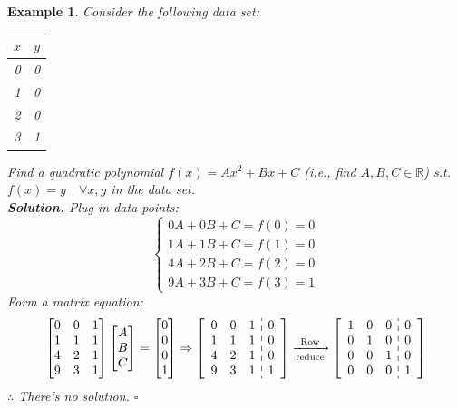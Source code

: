 \documentclass[12pt, a4paper]{article}
\newtheorem{eg}{Example}[subsection]
\newenvironment*{sol}{\indent\textbf{Solution. }}{\hfill{$\square$}\par}
\def\R{{\mathbb{R}}}
\def\C{{\mathbb{C}}}
\begin{document}
\begin{eg}\label{eg5.3.2}
	Consider the following data set: 
	\begin{center}\begin{tabular}{c|c}$x$&$y$\\\hline0&0\\1&0\\2&0\\3&1\end{tabular}\end{center} Find a quadratic polynomial $f(x)=Ax^2+Bx+C$ (i.e., find $A,B,C\in\R$) \emph{s.t.} $f(x)=y\quad\forall x,y$ in the data set.\\ 
	\begin{sol}
		Plug-in data points: \[\begin{cases}0A+0B+C=f(0)=0\\1A+1B+C=f(1)=0\\4A+2B+C=f(2)=0\\9A+3B+C=f(3)=1\end{cases}\]
		Form a matrix equation: \[\begin{bmatrix}0&0&1\\1&1&1\\4&2&1\\9&3&1\end{bmatrix}\begin{bmatrix}A\\B\\C\end{bmatrix}=\begin{bmatrix}0\\0\\0\\1\end{bmatrix}\Rightarrow\left[\begin{array}{c:c}\begin{matrix}0&0&1\\1&1&1\\4&2&1\\9&3&1\end{matrix}&\begin{matrix}0\\0\\0\\1\end{matrix}\end{array}\right]\xrightarrow[\text{reduce}]{\text{Row}}\left[\begin{array}{c:c}\begin{matrix}1&0&0\\0&1&0\\0&0&1\\0&0&0\end{matrix}&\begin{matrix}0\\0\\0\\1\end{matrix}\end{array}\right]\]
		$\therefore$ There's no solution.
	\end{sol}
\end{eg}
\end{document}
